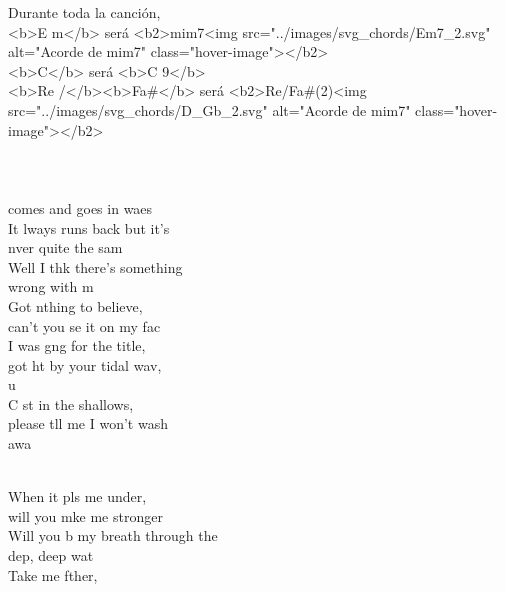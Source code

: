 \begin{cancion}%
Durante toda la canción, \\
<b>E m</b> será <b2>mim7<img src="../images/svg_chords/Em7_2.svg" alt="Acorde de mim7" class="hover-image"></b2>\\
<b>C</b>  será <b>C 9</b>\\
<b>Re /</b><b>Fa#</b> será <b2>Re/Fa#(2)<img src="../images/svg_chords/D_Gb_2.svg" alt="Acorde de mim7" class="hover-image"></b2>\\
	\jump\\
\jump
{}\vspace*{-0.4cm}\\
	           \\
	 comes and goes in waes\\
	It lways runs back but it's \\
	nver quite the sam\\
	Well I thk there's something \\
	wrong with m\\
	Got nthing to believe, \\
	can't you se it on my fac\\
\jump
	I was gng for the title, \\
	got ht by your tidal wav, \\
	u\\
	C st in the shallows, \\
	please tll me I won't wash\\
	 awa  \\\jump\\
	\begin{chorus}%
	When it pls me under, \\
	will you mke me stronger\\
	Will you b my breath through the \\
	dep, deep wat\\
	Take me fther, \\

\end{chorus}
\end{cancion}
